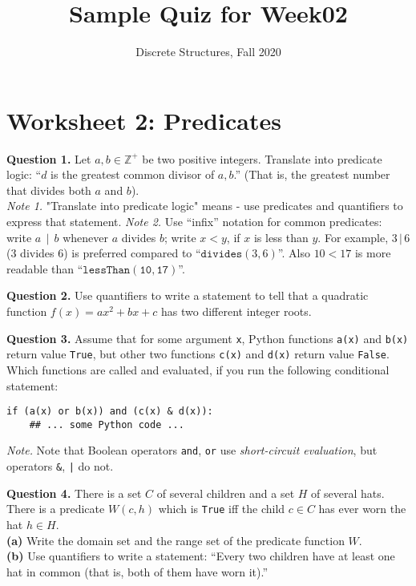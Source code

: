 \documentclass[jou]{apa6}
\title{Sample Quiz for Week02}
\author{Discrete Structures, Fall 2020}
\affiliation{RBS}
\begin{document}
\twocolumn

\section{Worksheet 2: Predicates}

{\bf Question 1.} Let $a,b \in \mathbb{Z}^{+}$ be two positive integers.
Translate into predicate logic: ``$d$ is the greatest common divisor 
of $a,b$.'' (That is, 
the greatest number that divides both $a$ and $b$).\\
{\em Note 1.} "Translate into predicate logic" means - use
predicates and quantifiers to express that statement.
{\em Note 2.} Use ``infix'' notation for common predicates: write 
$a\,\mid\,b$ whenever $a$ divides $b$; write $x < y$, if $x$ is less than $y$. For example, $3\,|\,6$ \hspace{1ex} 
($3$ divides $6$) is preferred compared to 
``$\mathtt{divides}(3,6)$''. Also \hspace{1ex} 
$10 < 17$ is more readable than
``$\mathtt{lessThan(10,17)}$''.

\vspace{10pt}
{\bf Question 2.} Use quantifiers to write a 
statement to tell that a quadratic
function $f(x) = ax^2 +bx+c$ 
has two different integer roots.


\vspace{10pt}
{\bf Question 3.} Assume that for some argument {\tt x}, 
Python functions {\tt a(x)} and {\tt b(x)}
return value {\tt True}, but other two functions 
{\tt c(x)} and {\tt d(x)} return value {\tt False}. 
Which functions are called and evaluated, if you run the following conditional statement:
\begin{verbatim}
if (a(x) or b(x)) and (c(x) & d(x)):
    ## ... some Python code ...
\end{verbatim}
{\em Note.} Note that Boolean operators {\tt and}, {\tt or} 
use {\em short-circuit
evaluation}, but operators {\tt \&}, {\tt |} do not. 


\vspace{10pt}
{\bf Question 4.} There is a set $C$ of several children and a 
set $H$ of several hats. There is a predicate $W(c,h)$ which is {\tt True}
iff the child $c \in C$ has ever worn the hat $h \in H$.\\
{\bf (a)} Write the domain set and the range set of the predicate function $W$. \\
{\bf (b)} Use quantifiers to write a statement: ``Every two 
children have at least one hat in common (that is, both of 
them have worn it).''
\end{document}
